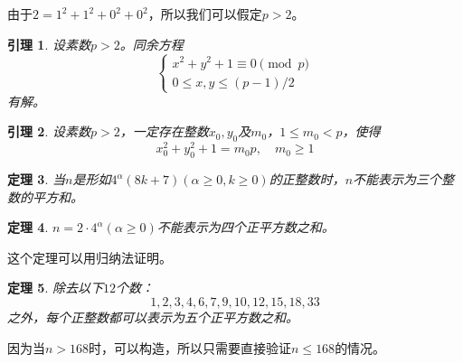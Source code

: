 \documentclass{ctexrep}
\newtheorem{thrm}{定理}[section]
\newtheorem{lemm}[thrm]{引理}
\begin{document}
由于$2=1^2+1^2+0^2+0^2$，所以我们可以假定$p>2$。
\begin{lemm}
设素数$p>2$。同余方程
\begin{displaymath}
\left\{
\begin{array}{l}
x^2+y^2+1\equiv 0\pmod{p}\\
0\leq x,y\leq (p-1)/2
\end{array}
\right.
\end{displaymath}
有解。
\end{lemm}

\begin{lemm}
设素数$p>2$，一定存在整数$x_0,y_0$及$m_0$，$1\leq m_0<p$，使得
\begin{displaymath}
x_0^2+y_0^2+1=m_0p,\quad m_0\geq 1
\end{displaymath}
\end{lemm}

\begin{thrm}
当$n$是形如$4^\alpha(8k+7)(\alpha\geq 0,k\geq 0)$的正整数时，$n$不能表示为三个整数的平方和。
\end{thrm}

\begin{thrm}
$n=2\cdot 4^\alpha(\alpha\geq 0)$不能表示为四个正平方数之和。
\end{thrm}

这个定理可以用归纳法证明。

\begin{thrm}
除去以下$12$个数：
\begin{displaymath}
1,2,3,4,6,7,9,10,12,15,18,33
\end{displaymath}
之外，每个正整数都可以表示为五个正平方数之和。
\end{thrm}

因为当$n>168$时，可以构造，所以只需要直接验证$n\leq 168$的情况。

\appendix
\end{document}
